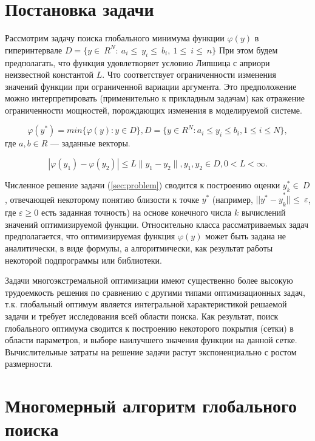 \documentclass[12pt, a4paper, russian]{article}
\begin{document}
\section{Постановка задачи}

Рассмотрим задачу поиска глобального минимума функции $\varphi(y)$ в гиперинтервале $D=\{ y\in\ R^N:\ a_i\le\ y_i\le\ b_i,\ 1\le\ i\le\ n \}$ При этом будем предполагать, что функция удовлетворяет условию Липшица с априори неизвестной константой $L$. Что соответствует ограниченности изменения значений функции при ограниченной вариации аргумента. Это предположение можно интерпретировать (применительно к прикладным задачам) как отражение ограниченности мощностей, порождающих изменения в моделируемой системе. 




\begin{equation} \label{sec:problem}   
\varphi(y^*) = min\{\varphi(y):y\in D\}, D = \{y \in R^N : a_i \leq y_i \leq b_i, 1 \leq i \leq N \},
\end{equation}
где $a,b \in R$ --- заданные векторы.


\begin{displaymath}
|\varphi(y_1)-\varphi(y_2)|\leq L\parallel y_1-y_2 \parallel
,y_1,y_2 \in D, 0<L< \infty.
\end{displaymath}




Численное решение задачи (\ref{sec:problem})   сводится к построению оценки $ y_k^\ast\in\ D$ , отвечающей некоторому понятию близости к точке $y^\ast$ (например, ${||y^\ast-y}_k^\ast||\le\ \varepsilon$, где $\varepsilon\geq0$ есть заданная точность) на основе конечного числа $k$ вычислений значений оптимизируемой функции. Относительно класса рассматриваемых задач предполагается, что оптимизируемая функция $\varphi(y)$ может быть задана не аналитически, в виде формулы, а алгоритмически, как результат работы некоторой подпрограммы или библиотеки.

Задачи многоэкстремальной оптимизации имеют существенно более высокую трудоемкость решения по сравнению с другими типами оптимизационных задач, т.к. глобальный оптимум является интегральной характеристикой решаемой задачи и требует исследования всей области поиска. Как результат, поиск глобального оптимума сводится к построению некоторого покрытия (сетки) в области параметров, и выборе наилучшего значения функции на данной сетке. Вычислительные затраты на решение задачи растут экспоненциально с ростом размерности.


\section{Многомерный алгоритм глобального поиска}
\end{document}
